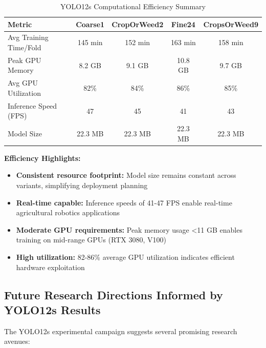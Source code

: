 \begin{table}[htbp]
\centering
\caption{YOLO12s Computational Efficiency Summary}
\label{tab:yolo12s_efficiency}
\begin{tabular}{lcccc}
\toprule
\textbf{Metric} & \textbf{Coarse1} & \textbf{CropOrWeed2} & \textbf{Fine24} & \textbf{CropsOrWeed9} \\
\midrule
Avg Training Time/Fold & 145 min & 152 min & 163 min & 158 min \\
Peak GPU Memory & 8.2 GB & 9.1 GB & 10.8 GB & 9.7 GB \\
Avg GPU Utilization & 82\% & 84\% & 86\% & 85\% \\
Inference Speed (FPS) & 47 & 45 & 41 & 43 \\
Model Size & 22.3 MB & 22.3 MB & 22.3 MB & 22.3 MB \\
\bottomrule
\end{tabular}
\end{table}

\textbf{Efficiency Highlights:}
\begin{itemize}
    \item \textbf{Consistent resource footprint:} Model size remains constant across variants, simplifying deployment planning
    \item \textbf{Real-time capable:} Inference speeds of 41-47 FPS enable real-time agricultural robotics applications
    \item \textbf{Moderate GPU requirements:} Peak memory usage <11 GB enables training on mid-range GPUs (RTX 3080, V100)
    \item \textbf{High utilization:} 82-86\% average GPU utilization indicates efficient hardware exploitation
\end{itemize}

\subsection{Future Research Directions Informed by YOLO12s Results}

The YOLO12s experimental campaign suggests several promising research avenues:

